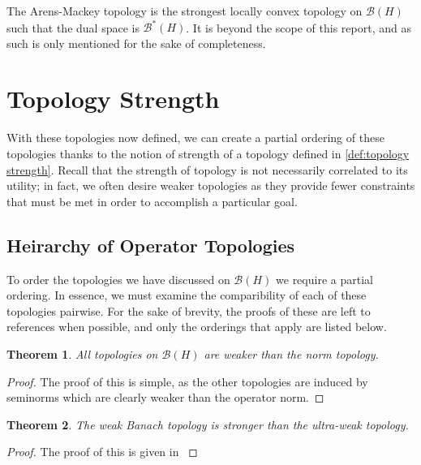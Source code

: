 \documentclass{article}
\theoremstyle{plain}
\newtheorem{theorem}{Theorem}
\theoremstyle{definition}
\newcommand{\BH}{\cal{B}(H)}
\newcommand{\DBH}{\cal{B}^*(H)}
\renewcommand{\cal}[1]{\mathcal{#1}}
\begin{document}
                The Arens-Mackey topology is the strongest locally convex topology on $\BH$ such that the dual space is $\DBH$.
                It is beyond the scope of this report, and as such is only mentioned for the sake of completeness.


\section{Topology Strength} \label{sec:topology strength}

        With these topologies now defined, we can create a partial ordering of these topologies thanks to the notion of strength of a topology defined in \cref{def:topology strength}.
        Recall that the strength of topology is not necessarily correlated to its utility; in fact, we often desire weaker topologies as they provide fewer constraints that must be met in order to accomplish a particular goal.

        \subsection{Heirarchy of Operator Topologies} \label{subsec:heirarchy}

                To order the topologies we have discussed on $\BH$ we require a partial ordering.
                In essence, we must examine the comparibility of each of these topologies pairwise. For the sake of brevity, the proofs of these are left to references when possible, and only the orderings that apply are listed below.

                \begin{theorem}
                        All topologies on $\BH$ are weaker than the norm topology.\cite{cycr}
                \end{theorem}
                \begin{proof}
                        The proof of this is simple, as the other topologies are induced by seminorms which are clearly weaker than the operator norm.
                \end{proof}
                
                \begin{theorem}
                        The weak Banach topology is stronger than the ultra-weak topology.
                \end{theorem}
                \begin{proof}
                        The proof of this is given in \cite{reed}
                \end{proof}
                
\end{document}
